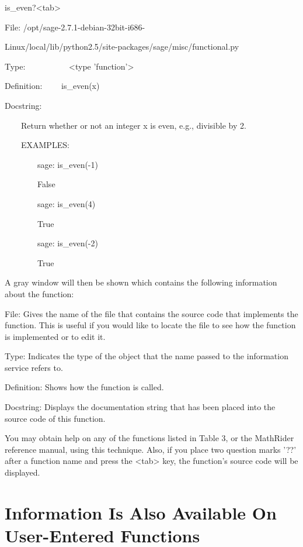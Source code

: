 \documentclass[12pt,oneside]{book}
\begin{document}
is\_even?{\textless}tab{\textgreater}

{\textbar}

File: /opt/sage{}-2.7.1{}-debian{}-32bit{}-i686{}-      

Linux/local/lib/python2.5/site{}-packages/sage/misc/functional.py  

Type: \ \ \ \ \ \ \ \ \ \ {\textless}type
'function'{\textgreater}        

Definition: \ \ \ \ is\_even(x)         

Docstring:

              

\ \ \ \ Return whether or not an integer x is even, e.g., divisible by
2.

              

\ \ \ \ EXAMPLES:            

\ \ \ \ \ \ \ \ sage: is\_even({}-1)

\ \ \ \ \ \ \ \ False            

\ \ \ \ \ \ \ \ sage: is\_even(4)          

\ \ \ \ \ \ \ \ True            

\ \ \ \ \ \ \ \ sage: is\_even({}-2)         

\ \ \ \ \ \ \ \ True            


A gray window will then be shown which contains the following information about the function: 

File: Gives the name of the file that contains the source code that implements the function. This is useful if you would like to locate the file to see how the function is implemented or to edit it. 

Type: Indicates the type of the object that the name passed to the information service refers to.


Definition: Shows how the function is called.


Docstring: Displays the documentation string that has been placed into the source code of this function. 

You may obtain help on any of the functions listed in Table 3, or the MathRider reference manual, using this technique. Also, if you place two question marks '??' after a function name and press the {\textless}tab{\textgreater} key, the function's source code will be displayed.

\section[Information Is Also Available On User{}-Entered Functions]{Information Is Also Available On User{}-Entered Functions}
\end{document}
